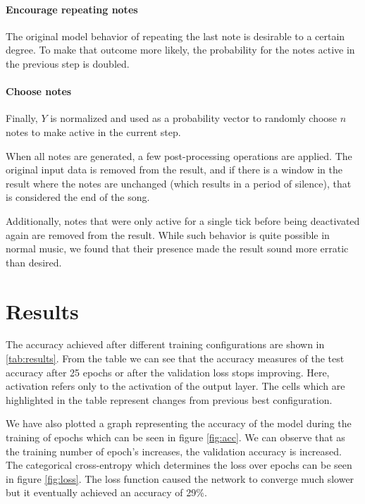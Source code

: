 \documentclass[11pt, twocolumn]{article}
\begin{document}
\paragraph{Encourage repeating notes} The original model behavior of repeating the last note is desirable to a certain degree. To make that outcome more likely, the probability for the notes active in the previous step is doubled.

\paragraph{Choose notes} Finally, $Y$ is normalized and used as a probability vector to randomly choose $n$ notes to make active in the current step.

\mbox{} %

When all notes are generated, a few post-processing operations are applied. The original input data is removed from the result, and if there is a window in the result where the notes are unchanged (which results in a period of silence), that is considered the end of the song. 

Additionally, notes that were only active for a single tick before being deactivated again are removed from the result. While such behavior is quite possible in normal music, we found that their presence made the result sound more erratic than desired. 



\section{Results}
\label{sec:results}
The accuracy achieved after different training configurations are shown in \autoref{tab:results}. From the table we can see that the accuracy measures of the test accuracy after 25 epochs or after the validation loss stops improving. Here, activation refers only to the activation of the output layer. The cells which are highlighted in the table represent changes from previous best configuration.

We have also plotted a graph representing the accuracy of the model during the training of epochs which can be seen in figure \ref{fig:acc}. We can observe that as the training number of epoch’s increases, the validation accuracy is increased. The categorical cross-entropy which determines the loss over epochs can be seen in figure \ref{fig:loss}. The loss function caused the network to converge much slower but it eventually achieved an accuracy of 29\%.
\end{document}
